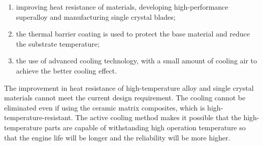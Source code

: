 \begin{enumerate}
\item improving heat resistance of materials, developing high-performance superalloy and manufacturing single crystal blades;
\item the thermal barrier coating is used to protect the base material and reduce the substrate temperature;
\item the use of advanced cooling technology, with a small amount of cooling air to achieve the better cooling effect.
\end{enumerate}

The improvement in heat resistance of high-temperature alloy and single crystal materials cannot meet the current design requirement. The cooling cannot be eliminated even if using the ceramic matrix composites, which is high-temperature-resistant. The active cooling method makes it possible that the high-temperature parts are capable of withstanding high operation temperature so that the engine life will be longer and the reliability will be more higher.

